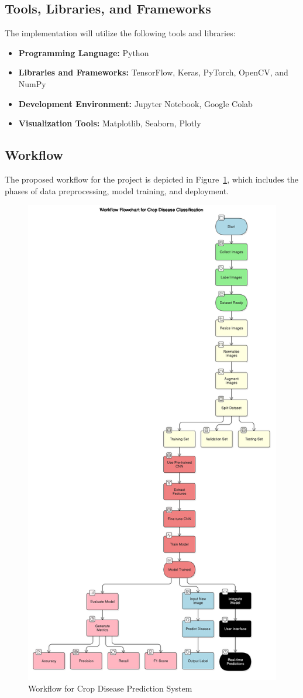 \subsection{Tools, Libraries, and Frameworks}
The implementation will utilize the following tools and libraries:
\begin{itemize}
    \item \textbf{Programming Language:} Python
    \item \textbf{Libraries and Frameworks:} TensorFlow, Keras, PyTorch, OpenCV, and NumPy
    \item \textbf{Development Environment:} Jupyter Notebook, Google Colab
    \item \textbf{Visualization Tools:} Matplotlib, Seaborn, Plotly
\end{itemize}
\newpage
\subsection{Workflow}
The proposed workflow for the project is depicted in Figure~\ref{fig:methodology_workflow}, which includes the phases of data preprocessing, model training, and deployment.

\begin{figure}[h]
    \centering
    \includegraphics[width=0.6\linewidth]{Images/flow.png}
    \caption{Workflow for Crop Disease Prediction System}
    \label{fig:methodology_workflow}
\end{figure}
\newpage
